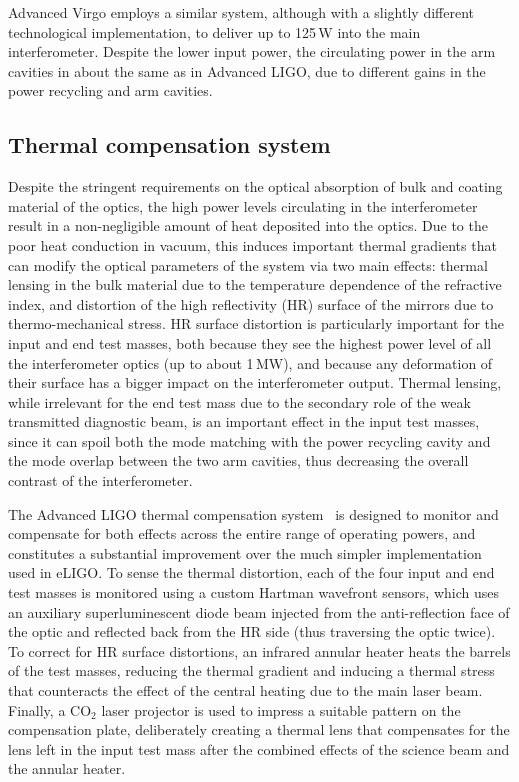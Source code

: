 Advanced Virgo employs a similar system, although with a slightly different technological implementation, to deliver up to 125\,W into the main interferometer. Despite the lower input power, the circulating power in the arm cavities in about the same as in Advanced LIGO, due to different gains in the power recycling and arm cavities.

\subsection{Thermal compensation system}
Despite the stringent requirements on the optical absorption of bulk and coating 
material of the optics, the high power levels circulating in the interferometer result 
in a non-negligible amount of heat deposited into the optics.
Due to the poor heat conduction in vacuum, this induces important thermal gradients that can modify 
the optical parameters of the system via two main effects: thermal lensing in the 
bulk material due to the temperature dependence of the refractive index,
and distortion of the high reflectivity (HR) surface of the mirrors due to thermo-mechanical stress.
HR surface distortion is particularly important for the input and end test masses, both because they see the highest power level of all the interferometer optics (up to about 1\,MW), and because any deformation of their surface has a bigger impact on the interferometer output.
Thermal lensing, while irrelevant for the end test mass due to the secondary role of the weak transmitted diagnostic beam, is an important effect in the input test masses, since it can spoil both the mode matching with the power recycling cavity and the mode overlap between the two arm cavities, thus decreasing the overall contrast of the interferometer.

The Advanced LIGO thermal compensation system~\cite{LIGOTCS_2016} is designed to monitor and compensate for both effects across the entire range of operating powers, and constitutes a substantial improvement over the much simpler implementation used in eLIGO.
To sense the thermal distortion, each of the four input and end test masses is monitored using a custom Hartman wavefront sensors, which uses an auxiliary superluminescent diode beam injected from the anti-reflection face of the optic and reflected back from the HR side (thus traversing the optic twice).
To correct for HR surface distortions, an infrared annular heater heats the barrels of the test masses, reducing the thermal gradient and inducing a thermal stress that counteracts the effect of the central heating due to the main laser beam.
Finally, a CO$_2$ laser projector is used to impress a suitable pattern on the compensation plate, deliberately creating a thermal lens that compensates for the lens left in the input test mass after the combined effects of the science beam and the annular heater.

